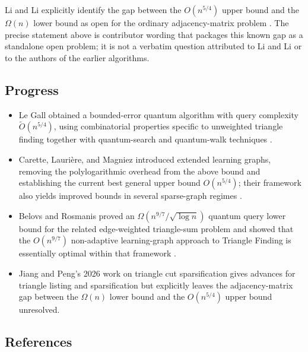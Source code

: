 Li and Li explicitly identify the gap between the $O(n^{5/4})$ upper
bound and the $\Omega(n)$ lower bound as open for the ordinary
adjacency-matrix problem
.  The precise statement above is
contributor wording that packages this known gap as a standalone open
problem; it is not a verbatim question attributed to Li and Li or to the
authors of the earlier algorithms.

\subsection*{Progress}

\begin{itemize}
  \item Le Gall obtained a bounded-error quantum algorithm with query complexity
$\widetilde O(n^{5/4})$, using combinatorial properties specific to
unweighted triangle finding together with quantum-search and quantum-walk
techniques
.

  \item Carette, Lauri\`ere, and Magniez introduced extended learning graphs,
removing the polylogarithmic overhead from the above bound and establishing
the current best general upper bound $O(n^{5/4})$; their framework also
yields improved bounds in several sparse-graph regimes
.

  \item Belovs and Rosmanis proved an $\Omega(n^{9/7}/\sqrt{\log n})$ quantum
query lower bound for the related edge-weighted triangle-sum problem and
showed that the $O(n^{9/7})$ non-adaptive learning-graph approach to
Triangle Finding is essentially optimal within that framework
.

  \item Jiang and Peng's 2026 work on triangle cut sparsification gives advances for triangle listing and sparsification but explicitly leaves the adjacency-matrix gap between the $\Omega(n)$ lower bound and the $O(n^{5/4})$ upper bound unresolved. 
\end{itemize}

\subsection*{References}

